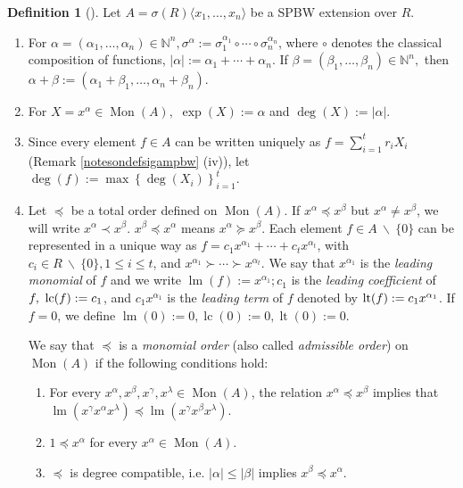 \documentclass{amsart}
\theoremstyle{definition}
\newtheorem{definition}[theorem]{Definition}
\theoremstyle{remark}
\numberwithin{equation}{section}
\begin{document}
\begin{definition}[{\cite[Definitions 6 and 11]{GallegoLezama2010}}]\label{definitioncoefficients}
Let $A = \sigma(R)\langle x_1,\dotsc, x_n\rangle$ be a SPBW extension over $R$.
\begin{enumerate}
\item[(i)] For $\alpha=\left(\alpha_{1}, \dotsc, \alpha_{n}\right) \in \mathbb{N}^{n}, \sigma^{\alpha}:=\sigma_{1}^{\alpha_{1}} \circ \dotsb  \circ \sigma_{n}^{\alpha_{n}}$, where $\circ$ denotes the classical composition of functions, $|\alpha|:=\alpha_{1}+\cdots+\alpha_{n} .$ If $\beta=\left(\beta_{1}, \dotsc, \beta_{n}\right) \in \mathbb{N}^{n},$ then $\alpha+\beta:=\left(\alpha_{1}+\beta_{1}, \dotsc, \alpha_{n}+\beta_{n}\right)$.
\item[(ii)] For $X=x^{\alpha} \in \operatorname{Mon}(A),$ $\exp (X):=\alpha$ and $\deg(X):=|\alpha|$.

\item[(iii)] Since every element $f\in A$ can be written uniquely as $f = \sum\limits_{i=1}^{t} r_iX_i$ (Remark \ref{notesondefsigampbw} (iv)), let $\deg(f):=\max \left\{\deg\left(X_{i}\right)\right\}_{i=1}^{t}$.

\item[(iv)] Let $\preceq$ be a total order defined on $\operatorname{Mon}(A).$ If $x^{\alpha} \preceq x^{\beta}$ but $x^{\alpha} \neq x^{\beta}$, we will write $x^{\alpha} \prec x^{\beta}.$ $x^{\beta} \preceq x^{\alpha}$ means $x^{\alpha} \succeq x^{\beta}.$  Each element $f \in A\ \backslash\ \{0\}$ can be represented in a unique way as $f=c_1 x^{\alpha_1}+\cdots+c_t x^{\alpha_t}$, with $c_i \in R\ \backslash\ \{0\}, 1 \leq i \leq t$, and $x^{\alpha_1} \succ \cdots \succ x^{\alpha_t}$. We say that $x^{\alpha_1}$ is the \textit{leading monomial} of $f$ and we write $\operatorname{lm}(f):=x^{\alpha_1} ; c_1$ is the \textit{leading coefficient} of $f,\ {\rm lc}(f):=c_1$, and $c_1 x^{\alpha_1}$ is the \textit{leading term} of $f$ denoted by ${\rm lt}(f):=c_1 x^{\alpha_1}$. If $f=0$, we define $\operatorname{lm}(0):=0, \operatorname{lc}(0):=0, \operatorname{lt}(0):=0$.

We say that $\preceq$ is a \textit{monomial order} (also called {\em admissible order}) on $\operatorname{Mon}(A)$ if the following conditions hold:
\begin{enumerate}
\item[\rm (a)] For every $x^\alpha, x^\beta, x^\gamma, x^\lambda \in \operatorname{Mon}(A)$, the relation $x^\alpha \preceq x^\beta$ implies that $\operatorname{lm}(x^\gamma x^\alpha  x^\lambda) \preceq \operatorname{lm}(x^\gamma x^\beta x^\lambda)$.

\item[\rm (b)] $1 \preceq x^\alpha$ for every $x^\alpha \in \operatorname{Mon}(A)$.

\item[\rm (c)] $\preceq$ is degree compatible, i.e.  $|\alpha| \leq |\beta|$ implies $x^\beta \preceq x^\alpha.$
\end{enumerate}
\end{enumerate}
\end{definition}
\end{document}
